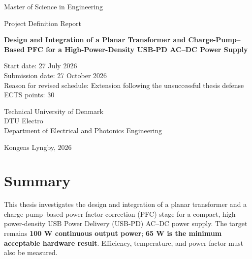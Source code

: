 \documentclass[12pt,a4paper]{report}
\begin{document}
\hypersetup{pageanchor=false}


\begin{titlepage}
\centering

{\Large Master of Science in Engineering \par}
\vspace{0.5cm}
{\Large Project Definition Report \par}

\vspace{2cm}

{\Huge\bfseries Design and Integration of a Planar Transformer and Charge-Pump--Based PFC for a High-Power-Density USB-PD AC--DC Power Supply \par}

\vspace{2cm}

Start date: 27 July 2026 \\
Submission date: 27 October 2026 \\
Reason for revised schedule: Extension following the unsuccessful thesis defense \\
ECTS points: 30 \\

\vfill

Technical University of Denmark \\
DTU Electro \\
Department of Electrical and Photonics Engineering \\

\vspace{1cm}

Kongens Lyngby, 2026

\end{titlepage}
\hypersetup{pageanchor=true}

\chapter*{Summary}

This thesis investigates the design and integration of a planar transformer and a charge-pump--based power factor correction (PFC) stage for a compact, high-power-density USB Power Delivery (USB-PD) AC--DC power supply. The target remains \textbf{100 W continuous output power}; \textbf{65 W is the minimum acceptable hardware result}. Efficiency, temperature, and power factor must also be measured.
\end{document}

